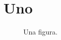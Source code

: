 \documentclass{article}
\begin{document}
\listoffigures
\listoftables
\section{Uno}
\begin{figure}[h]\centering\caption{Una figura.}\end{figure}
\end{document}
